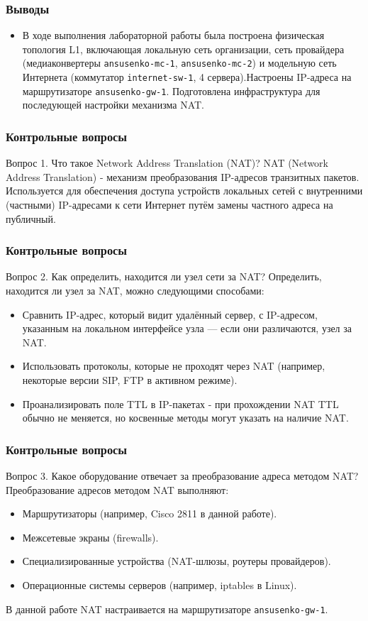 \begin{frame}
\frametitle{Выводы}
\begin{itemize}
    \item В ходе выполнения лабораторной работы была построена физическая топология L1, включающая локальную сеть организации, сеть провайдера (медиаконвертеры \texttt{ansusenko-mc-1}, \texttt{ansusenko-mc-2}) и модельную сеть Интернета (коммутатор \texttt{internet-sw-1}, 4 сервера).Настроены IP-адреса на маршрутизаторе \texttt{ansusenko-gw-1}. Подготовлена инфраструктура для последующей настройки механизма NAT.
\end{itemize}
\end{frame}

\begin{frame}
\frametitle{Контрольные вопросы}
\begin{block}{Вопрос 1. Что такое Network Address Translation (NAT)?}
NAT (Network Address Translation) - механизм преобразования IP-адресов транзитных пакетов. Используется для обеспечения доступа устройств локальных сетей с внутренними (частными) IP-адресами к сети Интернет путём замены частного адреса на публичный.
\end{block}
\end{frame}

\begin{frame}
\frametitle{Контрольные вопросы}
\begin{block}{Вопрос 2. Как определить, находится ли узел сети за NAT?}
Определить, находится ли узел за NAT, можно следующими способами:
\begin{itemize}
    \item Сравнить IP-адрес, который видит удалённый сервер, с IP-адресом, указанным на локальном интерфейсе узла — если они различаются, узел за NAT.
    \item Использовать протоколы, которые не проходят через NAT (например, некоторые версии SIP, FTP в активном режиме).
    \item Проанализировать поле TTL в IP-пакетах - при прохождении NAT TTL обычно не меняется, но косвенные методы могут указать на наличие NAT.
\end{itemize}
\end{block}
\end{frame}

\begin{frame}
\frametitle{Контрольные вопросы}
\begin{block}{Вопрос 3. Какое оборудование отвечает за преобразование адреса методом NAT?}
Преобразование адресов методом NAT выполняют:
\begin{itemize}
    \item Маршрутизаторы (например, Cisco 2811 в данной работе).
    \item Межсетевые экраны (firewalls).
    \item Специализированные устройства (NAT-шлюзы, роутеры провайдеров).
    \item Операционные системы серверов (например, iptables в Linux).
\end{itemize}
В данной работе NAT настраивается на маршрутизаторе \texttt{ansusenko-gw-1}.
\end{block}
\end{frame}

